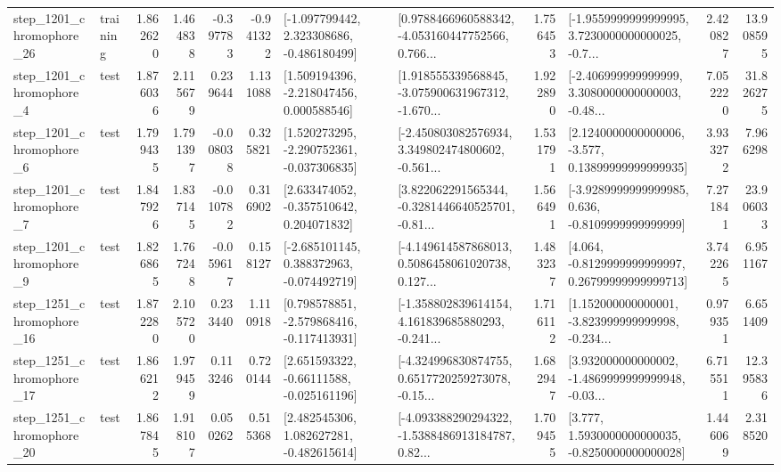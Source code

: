 \begin{tabular}{llrrrrllrlrr}
 step\_1201\_chromophore\_26 &  training &      1.862620 &    1.464838 &     -0.397783 & -0.941322 &   [-1.097799442, 2.323308686, -0.486180499] &  [0.9788466960588342, -4.053160447752566, 0.766... &       1.756453 &  [-1.9559999999999995, 3.7230000000000025, -0.7... &            2.420827 &         13.908595 \\
  step\_1201\_chromophore\_4 &      test &      1.876036 &    2.115679 &      0.239644 &  1.131088 &    [1.509194396, -2.218047456, 0.000588546] &  [1.918555339568845, -3.075900631967312, -1.670... &       1.922890 &  [-2.406999999999999, 3.3080000000000003, -0.48... &            7.052220 &         31.826275 \\
  step\_1201\_chromophore\_6 &      test &      1.799435 &    1.791397 &     -0.008038 &  0.325821 &   [1.520273295, -2.290752361, -0.037306835] &  [-2.450803082576934, 3.349802474800602, -0.561... &       1.531791 &  [2.1240000000000006, -3.577, 0.13899999999999935] &            3.933272 &          7.966298 \\
  step\_1201\_chromophore\_7 &      test &      1.847926 &    1.837145 &     -0.010782 &  0.316902 &    [2.633474052, -0.357510642, 0.204071832] &  [3.822062291565344, -0.3281446640525701, -0.81... &       1.566491 &  [-3.9289999999999985, 0.636, -0.8109999999999999] &            7.271841 &         23.906033 \\
  step\_1201\_chromophore\_9 &      test &      1.826865 &    1.767248 &     -0.059617 &  0.158127 &   [-2.685101145, 0.388372963, -0.074492719] &  [-4.149614587868013, 0.5086458061020738, 0.127... &       1.483237 &  [4.064, -0.8129999999999997, 0.26799999999999713] &            3.742265 &          6.951167 \\
 step\_1251\_chromophore\_16 &      test &      1.872280 &    2.105720 &      0.233440 &  1.110918 &   [0.798578851, -2.579868416, -0.117413931] &  [-1.358802839614154, 4.161839685880293, -0.241... &       1.716112 &  [1.152000000000001, -3.823999999999998, -0.234... &            0.979351 &          6.651409 \\
 step\_1251\_chromophore\_17 &      test &      1.866212 &    1.979459 &      0.113246 &  0.720144 &    [2.651593322, -0.66111588, -0.025161196] &  [-4.324996830874755, 0.6517720259273078, -0.15... &       1.682947 &  [3.932000000000002, -1.4869999999999948, -0.03... &            6.715511 &         12.395836 \\
 step\_1251\_chromophore\_20 &      test &      1.867845 &    1.918107 &      0.050262 &  0.515368 &    [2.482545306, 1.082627281, -0.482615614] &  [-4.093388290294322, -1.5388486913184787, 0.82... &       1.709455 &   [3.777, 1.5930000000000035, -0.8250000000000028] &            1.446069 &          2.318520 \\

\end{tabular}
